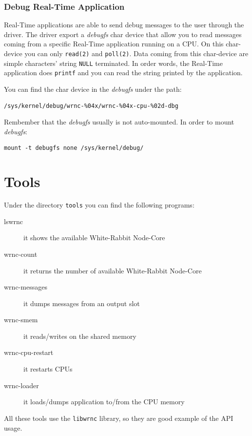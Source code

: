 \documentclass[a4paper,10pt]{article}
\begin{document}
\subsubsection{Debug Real-Time Application}%
Real-Time applications are able to send debug messages to the user
through the driver. The driver export a \textit{debugfs} char device
that allow you to read messages coming from a specific Real-Time
application running on a CPU. On this char-device you can only
\texttt{read(2)} and \texttt{poll(2)}. Data coming from this char-device
are simple characters' string \texttt{NULL} terminated. In order words,
the Real-Time application does \texttt{printf} and you can read the
string printed by the application.

You can find the char device in the \textit{debugfs} under the path:
\begin{verbatim}
/sys/kernel/debug/wrnc-%04x/wrnc-%04x-cpu-%02d-dbg
\end{verbatim}

Rembember that the \textit{debugfs} usually is not auto-mounted. In
order to mount \textit{debugfs}:

\begin{verbatim}
mount -t debugfs none /sys/kernel/debug/
\end{verbatim}

\section{Tools}%
Under the directory \texttt{tools} you can find the following
programs:

\begin{description}
  \item[lswrnc] it shows the available White-Rabbit Node-Core
  \item[wrnc-count] it returns the number of available White-Rabbit
    Node-Core
  \item[wrnc-messages] it dumps messages from an output slot
  \item[wrnc-smem] it reads/writes on the shared memory
  \item[wrnc-cpu-restart] it restarts CPUs
  \item[wrnc-loader] it loads/dumps application to/from the CPU memory
\end{description}

All these tools use the \texttt{libwrnc} library, so they are good
example of the API usage.
\end{document}
